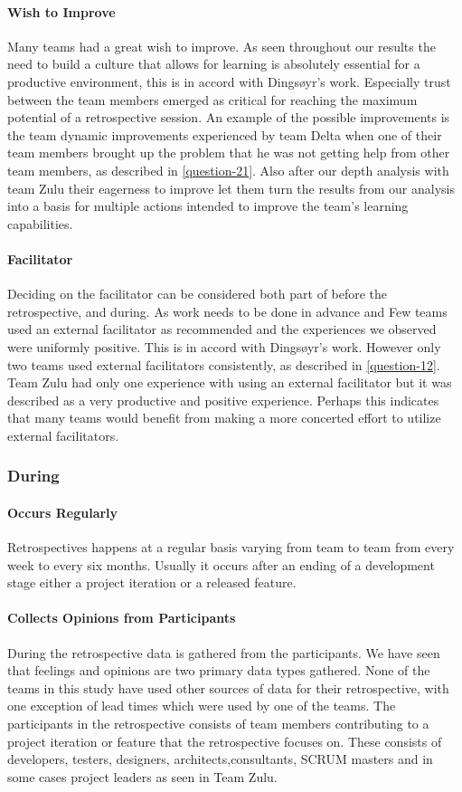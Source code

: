 \paragraph{Wish to Improve}
Many teams had a great wish to improve. As seen throughout our results the need to build a culture that allows for learning is absolutely essential for a productive environment, this is in accord with  Dingsøyr's work. Especially trust between the team members emerged as critical for reaching the maximum potential of a retrospective session. An example of the possible improvements is the team dynamic improvements experienced by team Delta when one of their team members brought up the problem that he was not getting help from other team members, as described in \autoref{question-21}. Also after our depth analysis with team Zulu their eagerness to improve let them turn the results from our analysis into a basis for multiple actions intended to improve the team's learning capabilities. 

\paragraph{Facilitator}
Deciding on the facilitator can be considered both part of before the retrospective, and during. As work needs to be done in advance and Few teams used an external facilitator as recommended and the experiences we observed were uniformly positive. This is in accord with Dingsøyr's work. However only two teams used external facilitators consistently, as described in \autoref{question-12}. Team Zulu had only one experience with using an external facilitator but it was described as a very productive and positive experience. Perhaps this indicates that many teams would benefit from making a more concerted effort to utilize external facilitators. 


\subsubsection{During}
\paragraph{Occurs Regularly}
Retrospectives happens at a regular basis varying from team to team from every week to every six months. Usually it occurs after an ending of a development stage either a project iteration or a released feature.

\paragraph{Collects Opinions from Participants}
During the retrospective data is gathered from the participants. We have seen that feelings and opinions are two primary data types gathered. None of the teams in this study have used other sources of data for their retrospective, with one exception of lead times which were used by one of the teams. The participants in the retrospective consists of team members contributing to a project iteration or feature that the retrospective focuses on. These consists of developers, testers, designers, architects,consultants, SCRUM masters and in some cases project leaders as seen in Team Zulu. 

